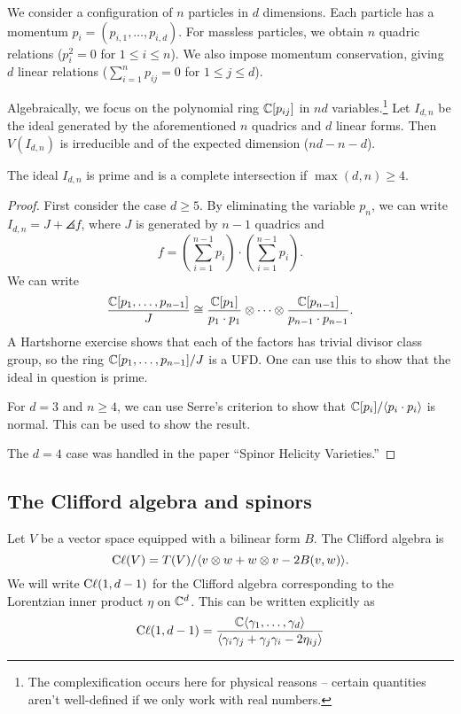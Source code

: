 \documentclass{amsart}
\begin{document}
We consider a configuration of $n$ particles in $d$ dimensions.
Each particle has a momentum $p_i = (p_{i,1}, \dots, p_{i,d})$.
For massless particles, we obtain $n$ quadric relations ($p_i^2 = 0$ for $1 \leq i \leq n$).
We also impose momentum conservation, giving $d$ linear relations ($\sum_{i=1}^n p_{ij} = 0$ for $1 \leq j \leq d$).

Algebraically, we focus on the polynomial ring $\mathbb{C}[p_{ij}]$ in $n d$ variables.\footnote{The complexification occurs here for physical reasons -- certain quantities aren't well-defined if we only work with real numbers.}
Let $I_{d,n}$ be the ideal generated by the aforementioned $n$ quadrics and $d$ linear forms.
Then $V(I_{d,n})$ is irreducible and of the expected dimension ($nd - n - d$).

\begin{thm}
	The ideal $I_{d,n}$ is prime and is a complete intersection if $\max(d, n) \geq 4$.
\end{thm}

\begin{proof}
	First consider the case $d \geq 5$.
	By eliminating the variable $p_n$, we can write $I_{d,n} = J + \angles{f}$, where $J$ is generated by $n - 1$ quadrics and 
	\[
		f = \left(\sum_{i=1}^{n-1} p_i\right) \cdot \left(\sum_{i=1}^{n-1} p_i\right).
	\]
	We can write
	\[
		\frac{\mathbb{C}[p_1, \dots, p_{n-1}]}{J} \cong \frac{\mathbb{C}[p_1]}{p_1 \cdot p_1} \otimes \dots \otimes \frac{\mathbb{C}[p_{n-1}]}{p_{n-1} \cdot p_{n-1}}.
	\]
	A Hartshorne exercise shows that each of the factors has trivial divisor class group, so the ring $\mathbb{C}[p_1, \dots, p_{n-1}] / J$ is a UFD.
	One can use this to show that the ideal in question is prime.

	For $d = 3$ and $n \geq 4$, we can use Serre's criterion to show that $\mathbb{C}[p_i] / \langle {p_i \cdot p_i} \rangle$ is normal.
	This can be used to show the result.

	The $d = 4$ case was handled in the paper ``Spinor Helicity Varieties.''
\end{proof}

\subsection{The Clifford algebra and spinors}

\begin{dfn}
	Let $V$ be a vector space equipped with a bilinear form $B$.
	The Clifford algebra is
	\[
		\operatorname{C\ell}(V) = T(V) / \langle {v \otimes w + w \otimes v - 2B(v, w)} \rangle.
	\]
	We will write $\operatorname{C\ell}(1, d - 1)$ for the Clifford algebra corresponding to the Lorentzian inner product $\eta$ on $\mathbb{C}^d$.
	This can be written explicitly as
	\[
		\operatorname{C\ell}(1, d-1) = \frac{\mathbb{C}\langle {\gamma_1, \dots, \gamma_d} \rangle}{\langle {\gamma_i \gamma_j + \gamma_j \gamma_i - 2 \eta_{ij}} \rangle}
	\]
\end{dfn}
\end{document}
